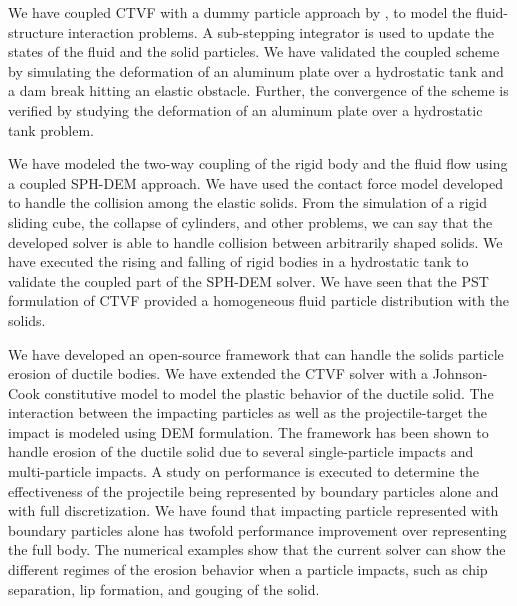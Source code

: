 We have coupled CTVF with a dummy particle approach by \textcite{Adami2012}, to
model the fluid-structure interaction problems. A sub-stepping integrator is
used to update the states of the fluid and the solid particles. We have
validated the coupled scheme by simulating the deformation of an aluminum plate
over a hydrostatic tank and a dam break hitting an elastic obstacle. Further,
the convergence of the scheme is verified by studying the deformation of an
aluminum plate over a hydrostatic tank problem.

We have modeled the two-way coupling of the rigid body and the fluid flow using
a coupled SPH-DEM approach. We have used the contact force model developed to
handle the collision among the elastic solids. From the simulation of a rigid
sliding cube, the collapse of cylinders, and other problems, we can say that the
developed solver is able to handle collision between arbitrarily shaped solids.
We have executed the rising and falling of rigid bodies in a hydrostatic tank to
validate the coupled part of the SPH-DEM solver. We have seen that the PST
formulation of CTVF provided a homogeneous fluid particle distribution with the
solids.


We have developed an open-source framework that can handle the solids particle
erosion of ductile bodies. We have extended the CTVF solver with a Johnson-Cook
constitutive model to model the plastic behavior of the ductile solid. The
interaction between the impacting particles as well as the projectile-target the
impact is modeled using DEM formulation. The framework has been shown to handle
erosion of the ductile solid due to several single-particle impacts and
multi-particle impacts. A study on performance is executed to determine the
effectiveness of the projectile being represented by boundary particles alone
and with full discretization. We have found that impacting particle represented
with boundary particles alone has twofold performance improvement over
representing the full body. The numerical examples show that the current solver
can show the different regimes of the erosion behavior when a particle impacts,
such as chip separation, lip formation, and gouging of the solid.



